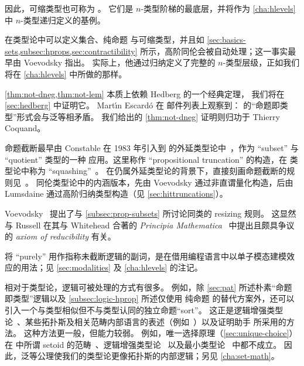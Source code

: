 因此，可缩类型也可称为 。
它们是 $n$-类型阶梯的最底层，并将作为 \cref{cha:hlevels} 中 $n$-类型递归定义的基例。

%
%

\sectionNotes

在类型论中可以定义集合、纯命题 与可缩类型，并且如 \cref{sec:basics-sets,subsec:hprops,sec:contractibility} 所示，高阶同伦会被自动处理；这一事实最早由 Voevodsky 指出。
实际上，他通过归纳定义了完整的 $n$-类型层级，正如我们将在 \cref{cha:hlevels} 中所做的那样。%

\cref{thm:not-dneg,thm:not-lem} 本质上依赖 Hedberg 的一个经典定理，
%
%
我们将在 \cref{sec:hedberg} 中证明它。
Mart\'\i n Escard\'o 在 \Agda 邮件列表上观察到：\LEM{} 的“命题即类型”形式会与泛等相矛盾。
我们给出的 \cref{thm:not-dneg} 证明则归功于 Thierry Coquand。

命题截断最早由 Constable 在 1983 年引入到
%
\NuPRL 的外延类型论中~\cite{Con85}，作为 ``subset'' 与 ``quotient'' 类型的一种
应用。这里称作 ``propositional truncation'' 的构造，在 \NuPRL 类型论中称为 ``squashing''~\cite{constable+86nuprl-book}。
在仍属外延类型论的背景下，直接刻画命题截断的规则见~\cite{ab:bracket-types}。
同伦类型论中的内涵版本，先由 Voevodsky 通过非直谓量化构造，后由 Lumsdaine 通过高阶归纳类型构造（见 \cref{sec:hittruncations}）。

%
Voevodsky~\cite{Universe-poly} 提出了与 \cref{subsec:prop-subsets} 所讨论同类的 resizing 规则。
%
这显然与 Russell 在其与 Whitehead 合著的 \emph{Principia Mathematica}~\cite{PM2} 中提出且颇具争议的 \emph{axiom of reducibility} 有关。

将 ``purely'' 用作指称未截断逻辑的副词，是在借用编程语言中以单子模态建模效应的用法；见 \cref{sec:modalities} 及 \cref{cha:hlevels} 的注记。

相对于类型论，逻辑可被处理的方式有很多。
例如，除 \cref{sec:pat} 所述朴素“命题即类型”逻辑以及 \cref{subsec:logic-hprop} 所述仅使用 纯命题 的替代方案外，还可以引入一个与类型相似但不与类型认同的独立命题“sort”。
这正是逻辑增强类型论~\cite{aczel2002collection}、某些拓扑斯及相关范畴内部语言的表述（例如~\cite{jacobs1999categorical,elephant}）以及证明助手 \Coq 所采用的方法。
这种方法更一般，但能力较弱。
例如，唯一选择原理（\cref{sec:unique-choice}）在 \Coq 中所谓 setoid 的范畴~\cite{Spiwack}、逻辑增强类型论~\cite{aczel2002collection} 以及最小类型论~\cite{maietti2005toward} 中都不成立。
因此，泛等公理使我们的类型论更像拓扑斯的内部逻辑；另见 \cref{cha:set-math}。

